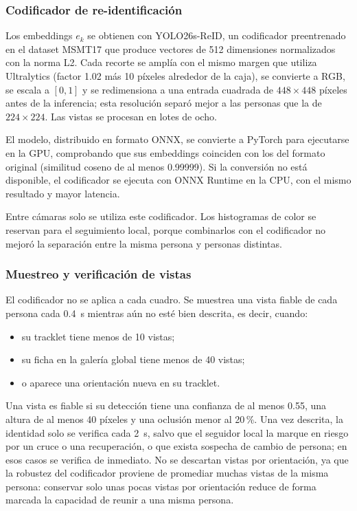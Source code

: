 \documentclass[12pt,letterpaper]{article}
\begin{document}
\subsubsection{Codificador de re-identificación}

Los embeddings $e_k$ se obtienen con YOLO26s-ReID, un codificador
preentrenado en el dataset MSMT17 que produce vectores de 512
dimensiones normalizados con la norma L2. Cada recorte se amplía con el
mismo margen que utiliza Ultralytics (factor 1.02 más 10 píxeles
alrededor de la caja), se convierte a RGB, se escala a $[0,1]$ y se
redimensiona a una entrada cuadrada de $448\times448$ píxeles antes de
la inferencia; esta resolución separó mejor a las personas que la de
$224\times224$. Las vistas se procesan en lotes de ocho.

El modelo, distribuido en formato ONNX, se convierte a PyTorch para
ejecutarse en la GPU, comprobando que sus embeddings coinciden con los
del formato original (similitud coseno de al menos 0.99999). Si la
conversión no está disponible, el codificador se ejecuta con ONNX
Runtime en la CPU, con el mismo resultado y mayor latencia.

Entre cámaras solo se utiliza este codificador. Los histogramas de color
se reservan para el seguimiento local, porque combinarlos con el
codificador no mejoró la separación entre la misma persona y personas
distintas.

\subsubsection{Muestreo y verificación de vistas}

El codificador no se aplica a cada cuadro. Se muestrea una vista fiable
de cada persona cada 0.4~s mientras aún no esté bien descrita, es decir,
cuando:

\begin{itemize}
    \item su tracklet tiene menos de 10 vistas;
    \item su ficha en la galería global tiene menos de 40 vistas;
    \item o aparece una orientación nueva en su tracklet.
\end{itemize}

Una vista es fiable si su detección tiene una confianza de al menos 0.55,
una altura de al menos 40 píxeles y una oclusión menor al 20\,\%. Una vez
descrita, la identidad solo se verifica cada 2~s, salvo que el seguidor
local la marque en riesgo por un cruce o una recuperación, o que exista
sospecha de cambio de persona; en esos casos se verifica de inmediato.
No se descartan vistas por orientación, ya que la robustez del
codificador proviene de promediar muchas vistas de la misma persona:
conservar solo unas pocas vistas por orientación reduce de forma marcada
la capacidad de reunir a una misma persona.
\end{document}
